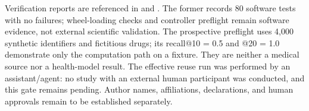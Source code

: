 Verification reports are referenced in  and . The former records 80 software tests with no failures; wheel-loading checks and controller preflight remain software evidence, not external scientific validation. The prospective preflight uses 4,000 synthetic identifiers and fictitious drugs; its recall@10 = 0.5 and @20 = 1.0 demonstrate only the computation path on a fixture. They are neither a medical source nor a health-model result. The effective reuse run was performed by an assistant/agent: no study with an external human participant was conducted, and this gate remains pending. Author names, affiliations, declarations, and human approvals remain to be established separately.
